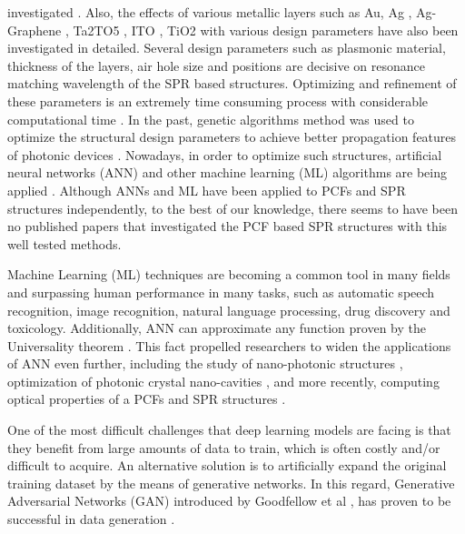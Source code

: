 \documentclass[journal]{IEEEtran}
\begin{document}
investigated \cite{rifat2016highly,yasli2019effect,zhang2011wagon,yasli2019multi,azzam2016multichannel}. Also, the effects of various metallic layers such as Au, Ag \cite{yasli2019multi}, Ag- Graphene \cite{rifat2016highly}, Ta2TO5 \cite{otupiri2015multi}, ITO \cite{dash2014spr}, TiO2 \cite{rifat2016highly} with various design parameters have also been investigated in detailed. Several design parameters such as plasmonic material, thickness of the layers, air hole size and positions are decisive on resonance matching wavelength of the SPR based structures. Optimizing and refinement of these parameters is an extremely time consuming process with considerable computational time \cite{fornarelli2009neural,abdelaziz2012photonic,paper0}. In the past, genetic algorithms \cite{abdelaziz2012photonic,borel2004topology} method was used to optimize the structural design parameters to achieve better propagation features of photonic devices \cite{rifat2016highly,caucheteur2015review}. Nowadays, in order to optimize such structures, artificial neural networks (ANN) and other machine learning (ML) algorithms are being applied \cite{fornarelli2009neural,paper0,hameed2008accurate}. Although ANNs and ML have been applied to PCFs \cite{fornarelli2009neural,paper0} and SPR structures \cite{fu2018optimization,mcatee2019artificial} independently, to the best of our knowledge, there seems to have been no published papers that investigated the PCF based SPR structures with this well tested methods.


Machine Learning (ML) techniques are becoming a common tool in many fields and surpassing human performance in many tasks, such as automatic speech recognition, image recognition, natural language processing, drug discovery and toxicology. Additionally, ANN can approximate any function proven by the Universality theorem  \cite{HORNIK1991251}. This fact propelled researchers to widen the applications of ANN even further, including the study of nano-photonic structures   \cite{kiarashinejad2020knowledge}, optimization of photonic crystal nano-cavities \cite{asano2018optimization}, and more recently, computing optical properties of a PCFs  \cite{paper0} and SPR structures \cite{fu2018optimization,mcatee2019artificial}.

One of the most difficult challenges that deep learning models are facing is that they benefit from large amounts of data to train, which is often costly and/or difficult to acquire. An alternative solution is to artificially expand the original training dataset by the means of generative networks. In this regard, Generative Adversarial Networks (GAN) introduced by Goodfellow et al  \cite{goodfellow2014generative}, has proven to be successful in data generation  \cite{schlegl2017unsupervised, zheng2017unlabeled, frid2018synthetic, tanaka2019data, perez2017effectiveness}.
\end{document}
